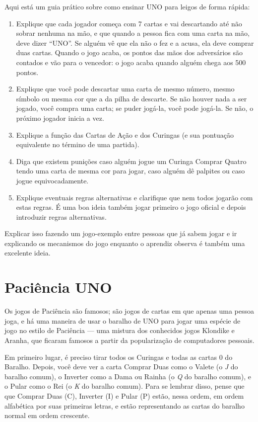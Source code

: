 Aqui está um guia prático sobre como ensinar UNO para leigos de forma rápida:

\begin{enumerate}
\item{Explique que cada jogador começa com 7 cartas e vai descartando até não sobrar nenhuma na mão, e que quando a pessoa fica com uma carta na mão, deve dizer ``UNO''. Se alguém vê que ela não o fez e a acusa, ela deve comprar duas cartas. Quando o jogo acaba, os pontos das mãos dos adversários são contados e vão para o vencedor: o jogo acaba quando alguém chega aos 500 pontos.}
\item{Explique que você pode descartar uma carta de mesmo número, mesmo símbolo ou mesma cor que a da pilha de descarte. Se não houver nada a ser jogado, você compra uma carta; se puder jogá-la, você pode jogá-la. Se não, o próximo jogador inicia a vez.}
\item{Explique a função das Cartas de Ação e dos Curingas (e sua pontuação equivalente no término de uma partida).}
\item{Diga que existem punições caso alguém jogue um Curinga Comprar Quatro tendo uma carta de mesma cor para jogar, caso alguém dê palpites ou caso jogue equivocadamente.}
\item{Explique eventuais regras alternativas e clarifique que nem todos jogarão com estas regras. É uma boa ideia também jogar primeiro o jogo oficial e depois introduzir regras alternativas.}
\end{enumerate}

Explicar isso fazendo um jogo-exemplo entre pessoas que já sabem jogar e ir explicando os mecanismos do jogo enquanto o aprendiz observa é também uma excelente ideia.

\newpage

\section{Paciência UNO}

Os jogos de Paciência são famosos; são jogos de cartas em que apenas uma pessoa joga, e há uma maneira de usar o baralho de UNO para jogar uma espécie de jogo no estilo de Paciência --- uma mistura dos conhecidos jogos Klondike e Aranha, que ficaram famosos a partir da popularização de computadores pessoais.

Em primeiro lugar, é preciso tirar todos os Curingas e todas as cartas 0 do Baralho. Depois, você deve ver a carta Comprar Duas como o Valete (o \emph{J} do baralho comum), o Inverter como a Dama ou Rainha (o \emph{Q} do baralho comum), e o Pular como o Rei (o \emph{K} do baralho comum). Para se lembrar disso, pense que que Comprar Duas (C), Inverter (I) e Pular (P) estão, nessa ordem, em ordem alfabética por suas primeiras letras, e estão representando as cartas do baralho normal em ordem crescente.

